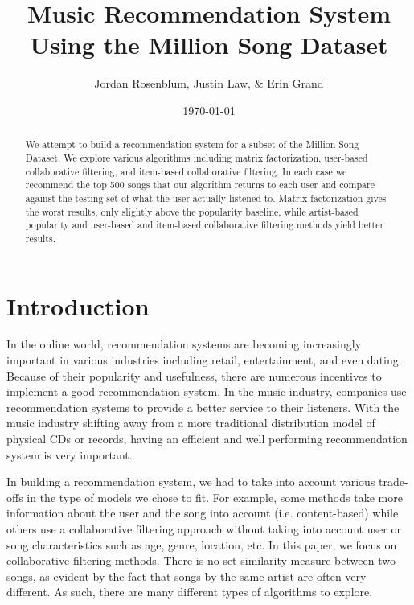 \documentclass[11pt,preprint]{aastex}
\begin{document}
\title{Music Recommendation System Using the Million Song Dataset}

 \author{Jordan Rosenblum, Justin Law, \& Erin Grand}
 
\date{\today}             

\begin{abstract}
We attempt to build a recommendation system for a subset of the Million Song Dataset. We explore various algorithms including matrix factorization, user-based collaborative filtering, and item-based collaborative filtering. In each case we recommend the top 500 songs that our algorithm returns to each user and compare against the testing set of what the user actually listened to. Matrix factorization gives the worst results, only slightly above the popularity baseline, while artist-based popularity and user-based and item-based collaborative filtering methods yield better results.
\end{abstract}

\tableofcontents

\section{Introduction}
In the online world, recommendation systems are becoming increasingly important in various industries including retail, entertainment, and even dating. 
Because of their popularity and usefulness, there are numerous incentives to implement a good recommendation system. 
In the music industry, companies use recommendation systems to provide a better service to their listeners. 
With the music industry shifting away from a more traditional distribution model of physical CDs or records, 
having an efficient and well performing recommendation system is very important. 

In building a recommendation system, we had to take into account various trade-offs in the type of models we chose to fit. For example, some methods take more information about the user and the song into account (i.e. content-based) while others use a collaborative filtering approach without taking into account user or song characteristics such as age, genre, location, etc. In this paper, we focus on collaborative filtering methods.
There is no set similarity measure between two songs, as evident by the fact that songs by the same artist are often very different. As such, there are many different types of algorithms to explore. 
\end{document}
